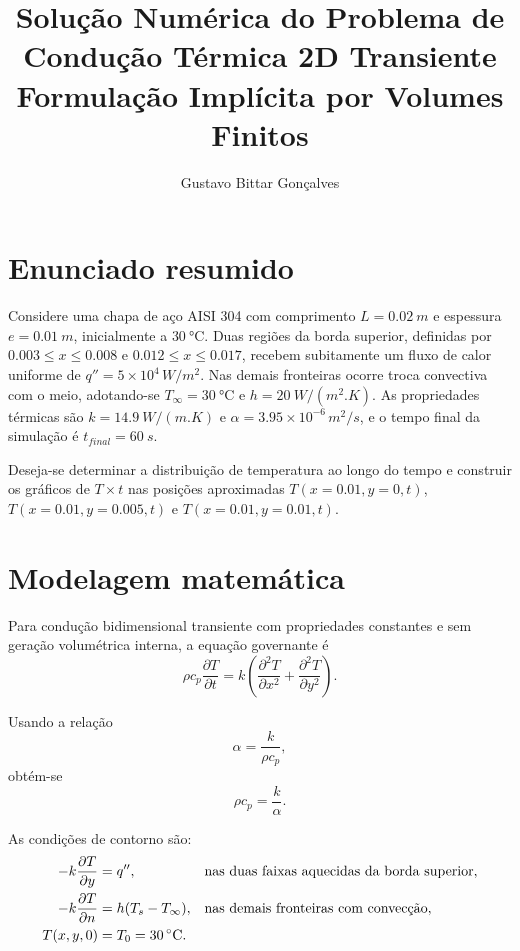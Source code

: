 \documentclass[12pt,a4paper]{article}
\title{Solução Numérica do Problema de Condução Térmica 2D Transiente\\Formulação Implícita por Volumes Finitos}
\author{Gustavo Bittar Gonçalves}
\date{}
\begin{document}
\maketitle

\section{Enunciado resumido}
Considere uma chapa de aço AISI 304 com comprimento $L=\SI{0.02}{m}$ e espessura $e=\SI{0.01}{m}$, inicialmente a $\SI{30}{\celsius}$. Duas regiões da borda superior, definidas por $0.003 \le x \le 0.008$ e $0.012 \le x \le 0.017$, recebem subitamente um fluxo de calor uniforme de $q''=5\times 10^4\,\si{W/m^2}$. Nas demais fronteiras ocorre troca convectiva com o meio, adotando-se $T_{\infty}=\SI{30}{\celsius}$ e $h=\SI{20}{W/(m^2.K)}$. As propriedades térmicas são $k=\SI{14.9}{W/(m.K)}$ e $\alpha = 3.95\times 10^{-6}\,\si{m^2/s}$, e o tempo final da simulação é $t_{final}=\SI{60}{s}$.

Deseja-se determinar a distribuição de temperatura ao longo do tempo e construir os gráficos de $T\times t$ nas posições aproximadas $T(x=0.01,y=0,t)$, $T(x=0.01,y=0.005,t)$ e $T(x=0.01,y=0.01,t)$.

\section{Modelagem matemática}
Para condução bidimensional transiente com propriedades constantes e sem geração volumétrica interna, a equação governante é
\begin{equation}
\rho c_p \frac{\partial T}{\partial t} = k\left(\frac{\partial^2 T}{\partial x^2} + \frac{\partial^2 T}{\partial y^2}\right).
\end{equation}

Usando a relação
\begin{equation}
\alpha = \frac{k}{\rho c_p},
\end{equation}
obtém-se
\begin{equation}
\rho c_p = \frac{k}{\alpha}.
\end{equation}

As condições de contorno são:
\begin{align}
-k\pdv{T}{y} &= q'', &&\text{nas duas faixas aquecidas da borda superior},\\
-k\pdv{T}{n} &= h(T_s-T_{\infty}), &&\text{nas demais fronteiras com convecção},\\
T(x,y,0) &= T_0 = \SI{30}{\celsius}. &&
\end{align}
\end{document}
